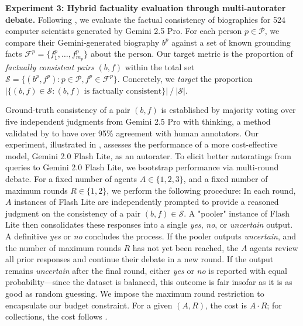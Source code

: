 \documentclass{article} %
\newcommand{\charlie}[1]{ {\color{red}[CCB: #1]}}
\begin{document}
\textbf{Experiment 3: Hybrid factuality evaluation through multi-autorater debate.}
Following \citet{du2023improving}, we evaluate the factual consistency of biographies for 524 computer scientists generated by Gemini 2.5 Pro. For each person $p\in\mathcal{P}$, we compare their Gemini-generated biography $b^p$ against a set of known grounding facts $\mathcal{F}^p=\{f_1^p,\dots,f_{m_p}^p\}$ about the person. 
%
Our target metric is the proportion of \textit{factually consistent pairs} $(b,f)$ within the total set $\mathcal{S}=\{(b^p,f^p): p\in\mathcal{P},f^p\in\mathcal{F}^p\}$. Concretely, we \textit{target} the proportion
$
|\{(b,f)\in\mathcal{S}:(b,f)\text{ is factually consistent}\}| ~/~ |\mathcal{S}|
$.

Ground-truth consistency of a pair $(b,f)$ is established by majority voting over five independent judgments from Gemini 2.5 Pro with thinking, a method validated by \citet{du2023improving} to have over 95\% agreement with human annotators. Our experiment, illustrated in , assesses the performance of a more cost-effective model, Gemini 2.0 Flash Lite, as an autorater.
%
To elicit better autoratings from queries to Gemini 2.0 Flash Lite, we bootstrap performance via multi-round debate. For a fixed number of agents $A\in\{1,2,3\}$, and a fixed number of maximum rounds $R\in\{1,2\}$, we perform the following procedure: In each round, $A$ instances of Flash Lite are independently prompted to provide a reasoned judgment on the consistency of a pair $(b,f)\in\mathcal{S}$. A "pooler" instance of Flash Lite then consolidates these responses into a single \emph{yes}, \emph{no}, or \emph{uncertain} output. A definitive \emph{yes} or \emph{no} concludes the process. If the pooler outputs \emph{uncertain}, and the number of maximum rounds $R$ has not yet been reached, the $A$ agents review all prior responses and continue their debate in a new round. If the output remains \emph{uncertain} after the final round, either \emph{yes} or \emph{no} is reported with equal probability---since the dataset is balanced, this outcome is fair insofar as it is as good as random guessing. We impose the maximum round restriction to encapsulate our budget constraint. For a given $(A,R)$, the cost is $A\cdot R$; for collections, the cost follows .
\end{document}
